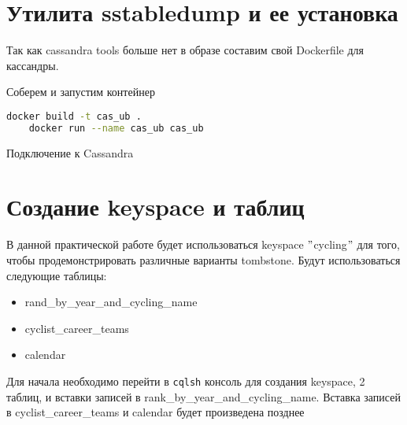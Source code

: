 \section{Утилита sstabledump и ее установка}

Так как cassandra tools больше нет в образе составим свой Dockerfile для кассандры.



Соберем и запустим контейнер

\begin{lstlisting}[language=bash]
	docker build -t cas_ub .
	docker run --name cas_ub cas_ub
\end{lstlisting}

\begin{image}
	\caption{Подключение к Cassandra}
	\label{fig:docker:con:cas}
\end{image}

\section{Создание keyspace и таблиц}

В данной практической работе будет использоваться keyspace \("\)cycling\("\)
для того, чтобы продемонстрировать различные варианты tombstone.
Будут использоваться следующие таблицы:

\begin{itemize}
	\item rand\_by\_year\_and\_cycling\_name
	\item cyclist\_career\_teams
	\item calendar
\end{itemize}

Для начала необходимо перейти в \texttt{cqlsh} консоль для создания keyspace,
2 таблиц, и вставки записей в rank\_by\_year\_and\_cycling\_name. Вставка
записей в cyclist\_career\_teams и calendar будет произведена
позднее

